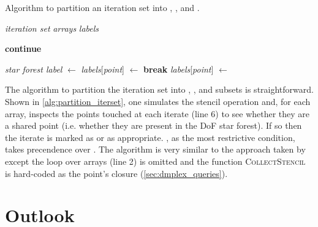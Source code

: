 \documentclass[thesis]{subfiles}
\begin{document}
\begin{algorithm}
  \caption{
    Algorithm to partition an iteration set into \coreiter{}, \rootiter{}, and \leafiter{}.
  }
  \begin{algorithmic}[1]
    \Require \textit{iteration set}
    \Require \textit{arrays} 
    \Require \textit{labels} 

       
         
          \State \textbf{continue}
        \EndIf

            \State \textit{star forest label} $\gets$ 
              \State \textit{labels}[\textit{point}] $\gets$ \leafiter{}
              \State \textbf{break} 
            \Else
              \State \textit{labels}[\textit{point}] $\gets$ \rootiter{}
            \EndIf
          \EndIf
        \EndFor
      \EndFor
    \EndFor
  \end{algorithmic}
  \label{alg:partition_iterset}
\end{algorithm}

The algorithm to partition the iteration set into \coreiter{}, \rootiter{}, and \leafiter{} subsets is straightforward.
Shown in \cref{alg:partition_iterset}, one simulates the stencil operation and, for each array, inspects the points touched at each iterate (line 6) to see whether they are a shared point (i.e. whether they are present in the DoF star forest).
If so then the iterate is marked as \rootiter{} or \leafiter{} as appropriate.
\leafiter{}, as the most restrictive condition, takes precendence over \rootiter{}.
The algorithm is very similar to the approach taken by  except the loop over arrays (line 2) is omitted and the function \textsc{CollectStencil} is hard-coded as the point's closure (\cref{sec:dmplex_queries}).

\section{Outlook}
\end{document}
